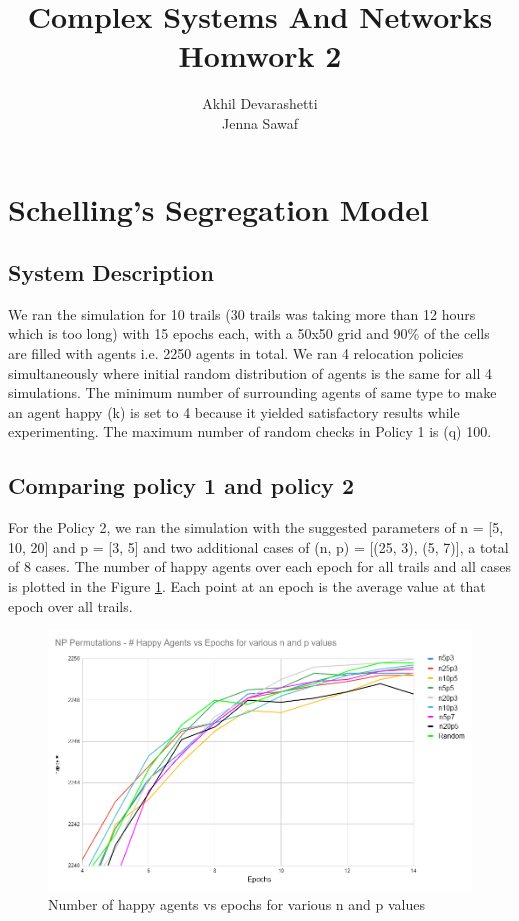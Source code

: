 \documentclass[a4paper,12pt]{article}
\title{Complex Systems And Networks\\Homwork 2}
\author{Akhil Devarashetti\\Jenna Sawaf}
\begin{document}
  \maketitle

  \section{Schelling's Segregation Model}
  \subsection{System Description}
  We ran the simulation for 10 trails (30 trails was taking more than 12 hours which is too long) with 15 epochs each, with a 50x50 grid and 90\% of the cells are filled with agents i.e. 2250 agents in total. We ran 4 relocation policies simultaneously where initial random distribution of agents is the same for all 4 simulations. The minimum number of surrounding agents of same type to make an agent happy (k) is set to 4 because it yielded satisfactory results while experimenting. The maximum number of random checks in Policy 1 is (q) 100.

  \subsection{Comparing policy 1 and policy 2}
  For the Policy 2, we ran the simulation with the suggested parameters of n = [5, 10, 20] and p = [3, 5] and two additional cases of (n, p) = [(25, 3), (5, 7)], a total of 8 cases. The number of happy agents over each epoch for all trails and all cases is plotted in the Figure \ref{fig:1.1}. Each point at an epoch is the average value at that epoch over all trails.

  \begin{figure}[ht]
    \centering
    \includegraphics[width=0.9\linewidth]{socialPermutations.PNG}
    \caption{Number of happy agents vs epochs for various n and p values}
    \label{fig:1.1}
  \end{figure}
\end{document}
